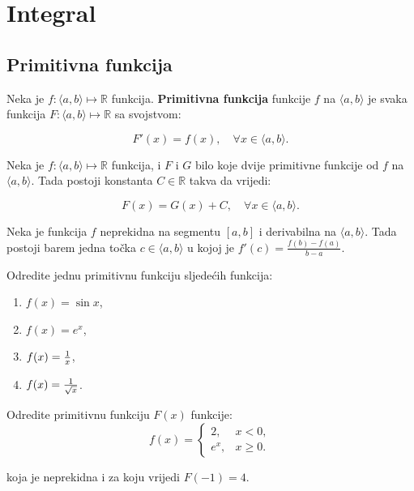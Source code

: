 \section{Integral}

\subsection{Primitivna funkcija}
Neka je $f: \langle a, b \rangle \mapsto \mathbb{R}$ funkcija.
\textbf{Primitivna funkcija} funkcije $f$ na $\langle a, b \rangle$ je svaka
funkcija $F: \langle a, b \rangle \mapsto \mathbb{R}$ sa svojstvom:

$$
F'(x) = f(x),\quad\forall x \in \langle a, b \rangle.
$$

\begin{theorem}
    Neka je $f: \langle a, b \rangle \mapsto \mathbb{R}$ funkcija, i $F$ i $G$
    bilo koje dvije primitivne funkcije od $f$ na $\langle a, b \rangle$. Tada
    postoji konstanta $C\in\mathbb{R}$ takva da vrijedi:

    $$
    F(x) = G(x) + C,\quad\forall x \in \langle a, b \rangle.
    $$
\end{theorem}

\begin{theorem}
    Neka je funkcija $f$ neprekidna na segmentu $[a, b]$ i derivabilna na
    $\langle a, b\rangle$. Tada postoji barem jedna točka $c \in\langle a,
    b\rangle$ u kojoj je $f'(c)=\frac{f(b)-f(a)}{b-a}$.
\end{theorem}

\begin{example}
    Odredite jednu primitivnu funkciju sljedećih funkcija:
    \begin{enumerate}
        \item $f(x) = \sin x$,
        \item $f(x) = e^x$,
        \item $f(x) = {1\over x}$,
        \item $f(x) = {1\over \sqrt{x}}$.
    \end{enumerate}
\end{example}

\begin{example}
    Odredite primitivnu funkciju $F(x)$ funkcije:
    $$
        f(x) = \begin{cases}
            2, & x < 0, \\
            e^x, & x \geq 0.
        \end{cases}
    $$

    koja je neprekidna i za koju vrijedi $F(-1) = 4$.
\end{example}

